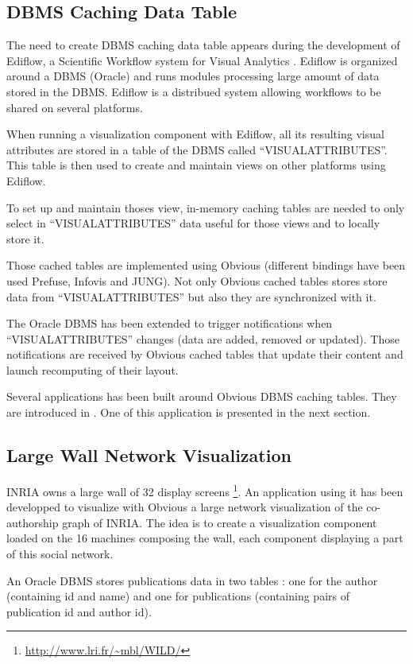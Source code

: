 \subsection{DBMS Caching Data Table}
\label{dbmscachingtable}

The need to create DBMS caching data table appears during the development
of Ediflow, a Scientific Workflow system for Visual Analytics \cite{Ediflow}.
Ediflow is organized around a DBMS (Oracle) and runs modules processing
large amount of data stored in the DBMS. Ediflow is a distribued system
allowing workflows to be shared on several platforms.

When running a visualization component with Ediflow, all its resulting
visual attributes are stored in a table of the DBMS called
``VISUALATTRIBUTES''. This table is then used to create and maintain
views on other platforms using Ediflow.

To set up and maintain thoses view, in-memory caching tables are needed
to only select in ``VISUALATTRIBUTES''  data useful for those views
and to locally store it.

Those cached tables are implemented using Obvious (different bindings
have been used Prefuse, Infovis and JUNG). Not only Obvious cached
tables stores store data from ``VISUALATTRIBUTES'' but also they are
synchronized with it.

The Oracle DBMS has been extended to trigger notifications when
``VISUALATTRIBUTES'' changes (data are added, removed or updated). Those
notifications are received by Obvious cached tables that update their
content and launch recomputing of their layout.

Several applications has been built around Obvious DBMS caching
tables. They are introduced in \cite{Ediflow}. One of this application
is presented in the next section.

\subsection{Large Wall Network Visualization}

INRIA owns a large wall of 32 display screens
\footnote{\url{http://www.lri.fr/~mbl/WILD/}}. An application using it
has been developped to visualize with Obvious a large network visualization
of the co-authorship graph of INRIA. The idea is to create a visualization
component loaded on the 16 machines composing the wall, each component
displaying a part of this social network.

An Oracle DBMS stores publications data in two tables : one for the author
(containing id and name) and one for publications (containing pairs
of publication id and author id).

